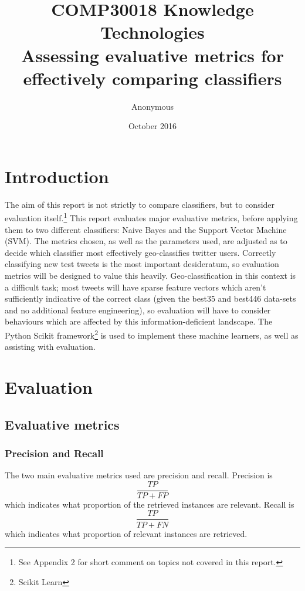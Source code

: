 \documentclass[twocolumn]{article}
\title{COMP30018 Knowledge Technologies \\ \large Assessing evaluative metrics for effectively comparing classifiers}
\author{Anonymous}
\date{October 2016}
\begin{document}
\maketitle

\section{Introduction}
The aim of this report is not strictly to compare classifiers, but to consider evaluation itself.\footnote{See Appendix 2 for short comment on topics not covered in this report.} This report evaluates major evaluative metrics, before applying them to two different classifiers: Naive Bayes and the Support Vector Machine (SVM). The metrics chosen, as well as the parameters used, are adjusted as to decide which classifier most effectively geo-classifies twitter users. Correctly classifying new test tweets is the most important desideratum, so evaluation metrics will be designed to value this heavily. Geo-classification in this context is a difficult task; most tweets will have sparse feature vectors which aren't sufficiently indicative of the correct class (given the best35 and best446 data-sets and no additional feature engineering), so evaluation will have to consider behaviours which are affected by this information-deficient landscape. The Python Scikit framework\footnote{\cite{scikit-learn} Scikit Learn} is used to implement these machine learners, as well as assisting with evaluation.

\section{Evaluation}
\subsection{Evaluative metrics}
\subsubsection{Precision and Recall}
The two main evaluative metrics used are precision and recall. Precision is
\begin{equation}
\frac{TP}{TP+FP}
\end{equation}
which indicates what proportion of the retrieved instances are relevant. Recall is
\begin{equation}
\frac{TP}{TP+FN}
\end{equation}
which indicates what proportion of relevant instances are retrieved.
\end{document}
